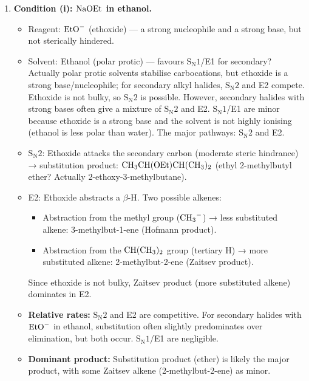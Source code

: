 \documentclass[11pt]{article}
\begin{document}
\begin{corrige}
\begin{enumerate}
\item \textbf{Condition (i): \(\ce{NaOEt}\) in ethanol.}
\begin{itemize}
\item Reagent: \(\ce{EtO-}\) (ethoxide) — a strong nucleophile and a strong base, but not sterically hindered.
\item Solvent: Ethanol (polar protic) — favours \(\mathrm{S_N1}\)/E1 for secondary? Actually polar protic solvents stabilise carbocations, but ethoxide is a strong base/nucleophile; for secondary alkyl halides, \(\mathrm{S_N2}\) and E2 compete. Ethoxide is not bulky, so \(\mathrm{S_N2}\) is possible. However, secondary halides with strong bases often give a mixture of \(\mathrm{S_N2}\) and E2. \(\mathrm{S_N1}\)/E1 are minor because ethoxide is a strong base and the solvent is not highly ionising (ethanol is less polar than water). The major pathways: \(\mathrm{S_N2}\) and E2.
\item \(\mathrm{S_N2}\): Ethoxide attacks the secondary carbon (moderate steric hindrance) → substitution product: \(\ce{CH3CH(OEt)CH(CH3)2}\) (ethyl 2-methylbutyl ether? Actually 2-ethoxy-3-methylbutane).
\item E2: Ethoxide abstracts a \(\beta\)-H. Two possible alkenes:
  \begin{itemize}
  \item Abstraction from the methyl group (\(\ce{CH3-}\)) → less substituted alkene: 3-methylbut-1-ene (Hofmann product).
  \item Abstraction from the \(\ce{CH(CH3)2}\) group (tertiary H) → more substituted alkene: 2-methylbut-2-ene (Zaitsev product).
  \end{itemize}
  Since ethoxide is not bulky, Zaitsev product (more substituted alkene) dominates in E2.
\item \textbf{Relative rates:} \(\mathrm{S_N2}\) and E2 are competitive. For secondary halides with \(\ce{EtO-}\) in ethanol, substitution often slightly predominates over elimination, but both occur. \(\mathrm{S_N1}\)/E1 are negligible.
\item \textbf{Dominant product:} Substitution product (ether) is likely the major product, with some Zaitsev alkene (2-methylbut-2-ene) as minor.
\end{itemize}


\end{enumerate}
\end{corrige}
\end{document}
